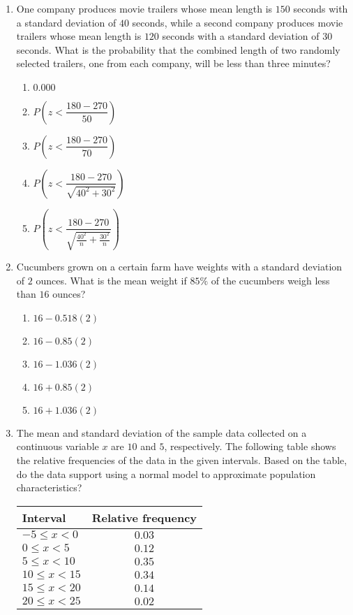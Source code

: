 \documentclass{article}
\begin{document}
\begin{enumerate}
\item One company produces movie trailers whose mean length is $150$ seconds with a standard deviation of $40$ seconds, while a second company produces movie trailers whose mean length is $120$ seconds with a standard deviation of $30$ seconds. What is the probability that the combined length of two randomly selected trailers, one from each company, will be less than three minutes? 
\begin{enumerate}
  \item $0.000$
  \item $P\!\left(z<\dfrac{180-270}{50}\right)$
  \item $P\!\left(z<\dfrac{180-270}{70}\right)$
  \item $P\!\left(z<\dfrac{180-270}{\sqrt{40^2+30^2}}\right)$
  \item $P\!\left(z<\dfrac{180-270}{\sqrt{\tfrac{40^2}{n}+\tfrac{30^2}{n}}}\right)$
\end{enumerate}

\item Cucumbers grown on a certain farm have weights with a standard deviation of $2$ ounces. What is the mean weight if $85\%$ of the cucumbers weigh less than $16$ ounces? 
\begin{enumerate}
  \item $16-0.518(2)$
  \item $16-0.85(2)$
  \item $16-1.036(2)$
  \item $16+0.85(2)$
  \item $16+1.036(2)$
\end{enumerate}

\item The mean and standard deviation of the sample data collected on a continuous variable $x$ are $10$ and $5$, respectively. The following table shows the relative frequencies of the data in the given intervals. Based on the table, do the data support using a normal model to approximate population characteristics? 

\begin{center}
\begin{tabular}{|l|c|}
\hline
\textbf{Interval} & \textbf{Relative frequency} \\
\hline
$-5 \le x < 0$   & $0.03$ \\
$0 \le x < 5$    & $0.12$ \\
$5 \le x < 10$   & $0.35$ \\
$10 \le x < 15$  & $0.34$ \\
$15 \le x < 20$  & $0.14$ \\
$20 \le x < 25$  & $0.02$ \\
\hline
\end{tabular}
\end{center}


\end{enumerate}
\end{document}

